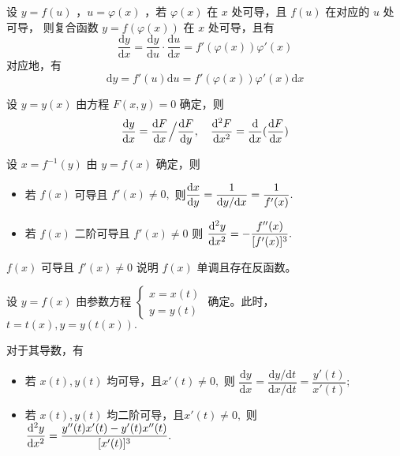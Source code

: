 \begin{Field}[复合函数求导]

    设 $ y=f(u) $ ，$ u=\varphi(x) $ ，若 $ \varphi(x) $ 在 $ x $ 处可导，且 $ f(u) $ 在对应的 $ u $ 处可导，
    则复合函数 $ y=f(\varphi(x)) $ 在 $ x $ 处可导，且有$$
        \frac{\mathrm{d}y}{\mathrm{d}x}=\frac{\mathrm{d}y}{\mathrm{d}u}\cdot
        \frac{\mathrm{d}u}{\mathrm{d}x}=f'(\varphi(x))\varphi'(x)
    $$  
    对应地，有$$
        \mathrm{d}y=f'(u)\mathrm{d}u=f'(\varphi(x))\varphi'(x)\mathrm{d}x
    $$ 
\end{Field}

\begin{Field}[隐函数求导数]

    设 $ y=y(x) $ 由方程 $ F(x,y)=0 $ 确定，则$$
        \frac{\mathrm{d}y}{\mathrm{d}x}={\dfrac{\mathrm{d}F}{\mathrm{d}x}}\Big\slash{\dfrac{\mathrm{d}F}{\mathrm{d}y}}
        ,\quad{}\frac{\mathrm{d}^2F}{\mathrm{d}x^2}=\frac{\mathrm{d}}{\mathrm{d}x}(\frac{\mathrm{d}F}{\mathrm{d}x})
    $$ 
\end{Field}


设 $ x = f^{-1}(y) $ 由 $ y = f(x) $ 确定，则
\begin{itemize}
    \item 若 $ f(x) $ 可导且 $ f'(x)\neq 0, $ 则$ \displaystyle \dfrac{\mathrm{d}x}{\mathrm{d}y} = 
    \dfrac{1}{\mathrm{d}y/ \mathrm{d}x} = \dfrac{1}{f'(x)}. $ 
    \item 若 $ f(x) $ 二阶可导且 $ f'(x)\neq 0 $ 则 $ \dfrac{\mathrm{d}^2y}{\mathrm{d}x^2} = 
    -\dfrac{f^{\prime\prime}(x)}{[f'(x)]^3}. $ 
\end{itemize}

$ f(x) $ 可导且 $ f'(x)\neq 0 $ 说明 $ f(x) $ 单调且存在反函数。


设 $ y = f(x) $ 由参数方程 $ \begin{cases}
    x = x(t) \\ y = y(t)
\end{cases} $ 确定。此时，$ t = t(x),y = y(t(x)). $ 

对于其导数，有
\begin{itemize}
    \item 若 $ x(t),y(t) $ 均可导，且$ x'(t)\neq 0, $ 则 $ \dfrac{\mathrm{d}y}{\mathrm{d}x} = 
    \dfrac{\mathrm{d}y/\mathrm{d}t}{\mathrm{d}x/\mathrm{d}t} = \dfrac{y'(t)}{x'(t)}; $ 
    \item 若 $ x(t),y(t) $ 均二阶可导，且$ x'(t)\neq 0, $ 则 $ \dfrac{\mathrm{d}^2y}{\mathrm{d}x^2} = 
    \dfrac{y^{\prime\prime}(t)x'(t) - y'(t)x^{\prime\prime}(t)}{[x'(t)]^3}. $ 
\end{itemize}


